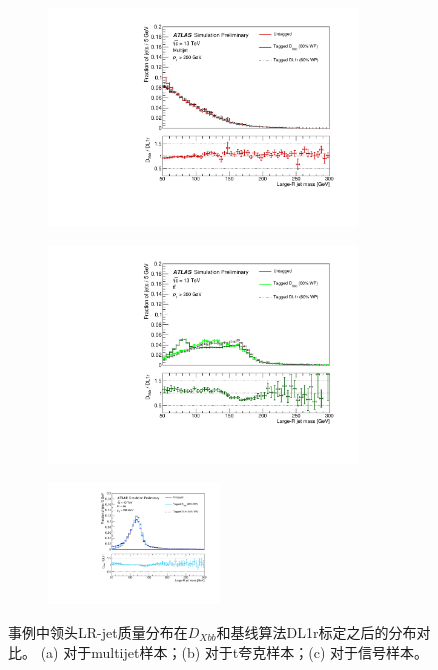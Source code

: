 \begin{figure}[!thbp]
  \begin{subfigure}{.5\textwidth}
  \centering
  \includegraphics[width=0.9\textwidth]{figuresXbb/efficiencies/jetjet_JZsculpt_all_largeRjet_mass_inclusive_discf025zoom.pdf}
  \caption{}
  \label{fig:MASS3QCD}
  \end{subfigure}
  \begin{subfigure}{.5\textwidth}
  \centering
  \includegraphics[width=0.9\textwidth]{figuresXbb/efficiencies/ttsculpt_all_largeRjet_mass_inclusive_discf025zoom.pdf}
  \caption{}
  \label{fig:MASS3Top}
  \end{subfigure}
\newline 
  \begin{subfigure}{.99\textwidth}
  \centering
  \includegraphics[width=0.5\textwidth]{figuresXbb/efficiencies/RS_G_hh_bbbbsculpt_all_largeRjet_mass_inclusive_discf025zoom.pdf}
  \caption{}
  \label{fig:MASS3Higgs}
  \end{subfigure}
  \caption{
 事例中领头LR-jet质量分布在$D_{Xbb}$和基线算法DL1r标定之后的分布对比。
 (a) 对于multijet样本；(b) 对于t夸克样本；(c) 对于信号样本。
 }
\label{fig:MASS3}
\end{figure}
